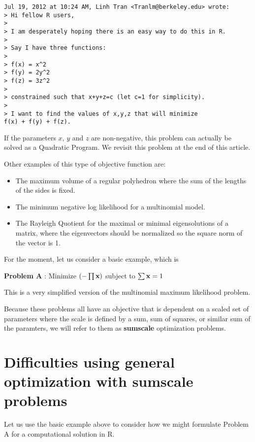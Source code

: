 \documentclass[11pt]{article}
\newcommand{\B}[1]{{\bf #1 \rm}}
\newcommand{\R}{{\sf R}}
\begin{document}
\begin{verbatim}
Jul 19, 2012 at 10:24 AM, Linh Tran <Tranlm@berkeley.edu> wrote:
> Hi fellow R users,
>
> I am desperately hoping there is an easy way to do this in R.
>
> Say I have three functions:
>
> f(x) = x^2
> f(y) = 2y^2
> f(z) = 3z^2
>
> constrained such that x+y+z=c (let c=1 for simplicity).
>
> I want to find the values of x,y,z that will minimize 
f(x) + f(y) + f(z).
\end{verbatim}

If the parameters $x$, $y$ and $z$ are non-negative, this problem can actually 
be solved as a Quadratic Program. We revisit this problem at the end of this
article.

Other examples of this type of objective function are:

\begin{itemize}
\item{The maximum volume  of a regular polyhedron where the sum of the lengths
of the sides is fixed.}
\item{The minimum negative log likelihood for a multinomial model.}
\item{The Rayleigh Quotient for the maximal or minimal eigensolutions of a matrix, where
the eigenvectors should be normalized so the square norm of the vector is 1.}
\end{itemize}

For the moment, let us consider a basic example, which is 
\vspace*{10pt}

\B{Problem A}: Minimize  $( - \prod{\B{x}})$ subject to $\sum{\B{x}}=1$
\vspace*{10pt}

This is a very simplified version of the multinomial maximum likelihood problem. 

Because these problems all have an objective that is dependent on a scaled set of parameters 
where the scale is defined by a sum, sum of squares, or similar sum of the paramters, we will
refer to them as \B{sumscale} optimization problems.

\section{Difficulties using general optimization with sumscale problems}

Let us use the basic example above to consider how we might formulate Problem A for a
computational solution in \R. 
\end{document}
